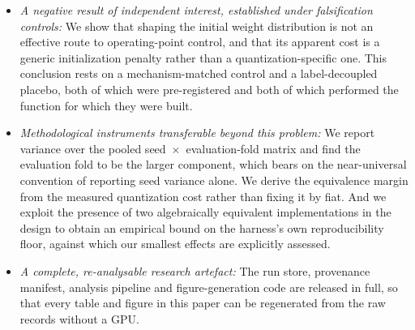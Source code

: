 \documentclass[final,5p,times,twocolumn]{elsarticle}
\theoremstyle{remark}
\begin{document}
\begin{itemize}
\item[] \textit{A negative result of independent interest, established under
falsification controls:} We show that shaping the initial weight distribution
is not an effective route to operating-point control, and that its apparent
cost is a generic initialization penalty rather than a quantization-specific
one. This conclusion rests on a mechanism-matched control and a label-decoupled
placebo, both of which were pre-registered and both of which performed the
function for which they were built.

\item[] \textit{Methodological instruments transferable beyond this problem:} We
report variance over the pooled seed~$\times$~evaluation-fold matrix and find
the evaluation fold to be the larger component, which bears on the
near-universal convention of reporting seed variance alone. We derive the
equivalence margin from the measured quantization cost rather than fixing it
by fiat. And we exploit the presence of two algebraically equivalent
implementations in the design to obtain an empirical bound on the harness's
own reproducibility floor, against which our smallest effects are explicitly
assessed.

\item[] \textit{A complete, re-analysable research artefact:} The run store,
provenance manifest, analysis pipeline and figure-generation code are released
in full, so that every table and figure in this paper can be regenerated from
the raw records without a GPU.
\end{itemize}
\end{document}
